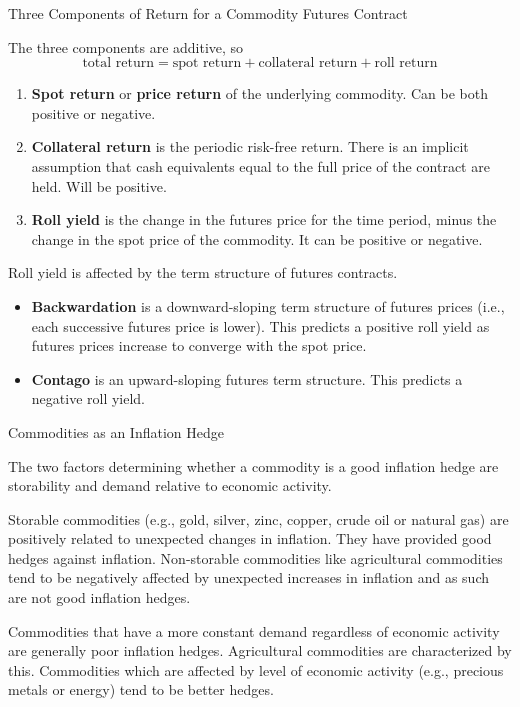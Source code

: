 \documentclass[../custom,grid]{flashcards}
\begin{document}
\begin{flashcard}{Three Components of Return for a Commodity Futures Contract}
    \begin{flushleft}
        The three components are additive, so
        \[
            \text{total return} = \text{spot return} + \text{collateral return} + \text{roll return}
        \]
        \begin{enumerate}
            \item \textbf{Spot return} or \textbf{price return} of the underlying commodity. Can be both positive or negative.
            \item \textbf{Collateral return} is the periodic risk-free return. There is an implicit assumption that cash equivalents equal to the full price of the contract are held. Will be positive.
            \item \textbf{Roll yield} is the change in the futures price for the time period, minus the change in the spot price of the commodity. It can be positive or negative.
        \end{enumerate}
        Roll yield is affected by the term structure of futures contracts.
        \begin{itemize}
            \item \textbf{Backwardation} is a downward-sloping term structure of futures prices (i.e., each successive futures price is lower). This predicts a positive roll yield as futures prices increase to converge with the spot price.
            \item \textbf{Contago} is an upward-sloping futures term structure. This predicts a negative roll yield.
        \end{itemize}
    \end{flushleft}
\end{flashcard}

\begin{flashcard}{Commodities as an Inflation Hedge}
    \begin{flushleft}
        The two factors determining whether a commodity is a good inflation hedge are storability and demand relative to economic activity.\newline

        Storable commodities (e.g., gold, silver, zinc, copper, crude oil or natural gas) are positively related to unexpected changes in inflation. They have provided good hedges against inflation. Non-storable commodities like agricultural commodities tend to be negatively affected by unexpected increases in inflation and as such are not good inflation hedges.\newline

        Commodities that have a more constant demand regardless of economic activity are generally poor inflation hedges. Agricultural commodities are characterized by this. Commodities which are affected by level of economic activity (e.g., precious metals or energy) tend to be better hedges.
    \end{flushleft}
\end{flashcard}
\end{document}
